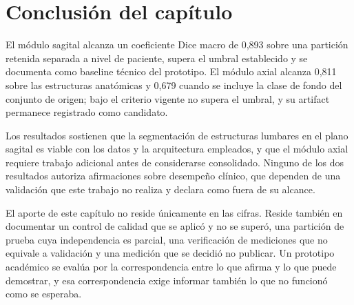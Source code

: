 \section{Conclusión del capítulo}

El módulo sagital alcanza un coeficiente Dice macro de 0,893 sobre una partición retenida separada a nivel de paciente, supera el umbral establecido y se documenta como baseline técnico del prototipo. El módulo axial alcanza 0,811 sobre las estructuras anatómicas y 0,679 cuando se incluye la clase de fondo del conjunto de origen; bajo el criterio vigente no supera el umbral, y su artifact permanece registrado como candidato.

Los resultados sostienen que la segmentación de estructuras lumbares en el plano sagital es viable con los datos y la arquitectura empleados, y que el módulo axial requiere trabajo adicional antes de considerarse consolidado. Ninguno de los dos resultados autoriza afirmaciones sobre desempeño clínico, que dependen de una validación que este trabajo no realiza y declara como fuera de su alcance.

El aporte de este capítulo no reside únicamente en las cifras. Reside también en documentar un control de calidad que se aplicó y no se superó, una partición de prueba cuya independencia es parcial, una verificación de mediciones que no equivale a validación y una medición que se decidió no publicar. Un prototipo académico se evalúa por la correspondencia entre lo que afirma y lo que puede demostrar, y esa correspondencia exige informar también lo que no funcionó como se esperaba.
